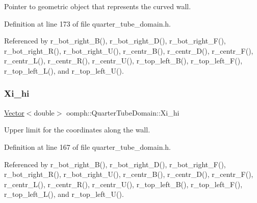 Pointer to geometric object that represents the curved wall. 



Definition at line 173 of file quarter\+\_\+tube\+\_\+domain.\+h.



Referenced by r\+\_\+bot\+\_\+right\+\_\+\+B(), r\+\_\+bot\+\_\+right\+\_\+\+D(), r\+\_\+bot\+\_\+right\+\_\+\+F(), r\+\_\+bot\+\_\+right\+\_\+\+R(), r\+\_\+bot\+\_\+right\+\_\+\+U(), r\+\_\+centr\+\_\+\+B(), r\+\_\+centr\+\_\+\+D(), r\+\_\+centr\+\_\+\+F(), r\+\_\+centr\+\_\+\+L(), r\+\_\+centr\+\_\+\+R(), r\+\_\+centr\+\_\+\+U(), r\+\_\+top\+\_\+left\+\_\+\+B(), r\+\_\+top\+\_\+left\+\_\+\+F(), r\+\_\+top\+\_\+left\+\_\+\+L(), and r\+\_\+top\+\_\+left\+\_\+\+U().

\mbox{\label{classoomph_1_1QuarterTubeDomain_ab28aec59a8756da42f74c0affb7276c2}} 
\subsubsection{\texorpdfstring{Xi\+\_\+hi}{Xi\_hi}}
{\footnotesize\ttfamily \hyperlink{classoomph_1_1Vector}{Vector}$<$double$>$ oomph\+::\+Quarter\+Tube\+Domain\+::\+Xi\+\_\+hi\hspace{0.3cm}{\ttfamily [private]}}



Upper limit for the coordinates along the wall. 



Definition at line 167 of file quarter\+\_\+tube\+\_\+domain.\+h.



Referenced by r\+\_\+bot\+\_\+right\+\_\+\+B(), r\+\_\+bot\+\_\+right\+\_\+\+D(), r\+\_\+bot\+\_\+right\+\_\+\+F(), r\+\_\+bot\+\_\+right\+\_\+\+R(), r\+\_\+bot\+\_\+right\+\_\+\+U(), r\+\_\+centr\+\_\+\+B(), r\+\_\+centr\+\_\+\+D(), r\+\_\+centr\+\_\+\+F(), r\+\_\+centr\+\_\+\+L(), r\+\_\+centr\+\_\+\+R(), r\+\_\+centr\+\_\+\+U(), r\+\_\+top\+\_\+left\+\_\+\+B(), r\+\_\+top\+\_\+left\+\_\+\+F(), r\+\_\+top\+\_\+left\+\_\+\+L(), and r\+\_\+top\+\_\+left\+\_\+\+U().

\mbox{\label{classoomph_1_1QuarterTubeDomain_a63fb621521e3e01a84ae393f73fc7117}} 
